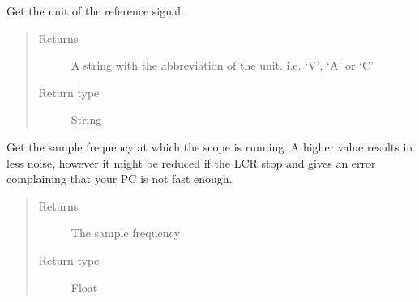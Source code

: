 \documentclass[letterpaper,10pt,english]{sphinxmanual}
\begin{document}
\begin{fulllineitems}
\begin{fulllineitems}
\begin{quote}
\begin{description}
\end{description}\end{quote}

\end{fulllineitems}


\begin{fulllineitems}
\label{\detokenize{index:TiePieLCR_settings.TiePieLCR_settings.get_reference_unit}}
\sphinxAtStartPar
Get the unit of the reference signal.
\begin{quote}\begin{description}
\item[{Returns}] \leavevmode
\sphinxAtStartPar
A string with the abbreviation of the unit. i.e. ‘V’, ‘A’ or ‘C’

\item[{Return type}] \leavevmode
\sphinxAtStartPar
String

\end{description}\end{quote}

\end{fulllineitems}


\begin{fulllineitems}
\label{\detokenize{index:TiePieLCR_settings.TiePieLCR_settings.get_sample_frequency}}
\sphinxAtStartPar
Get the sample frequency at which the scope is running. A higher value results in less noise, however it might be reduced if the LCR stop and gives an error complaining that your PC is not fast enough.
\begin{quote}\begin{description}
\item[{Returns}] \leavevmode
\sphinxAtStartPar
The sample frequency

\item[{Return type}] \leavevmode
\sphinxAtStartPar
Float

\end{description}\end{quote}


\end{fulllineitems}
\end{fulllineitems}
\end{document}
